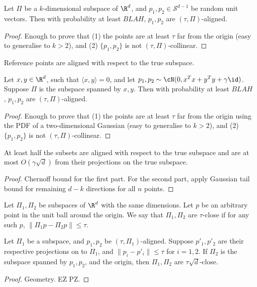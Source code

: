 \begin{lemma}
    Let $\Pi$ be a $k$-dimensional subspace of $\R^d$,
    and $p_1,p_2\in\mathcal{S}^{d-1}$ be random unit vectors.
    Then with probability at least $BLAH$, $p_1,p_2$ are
    $(\tau,\Pi)$-aligned.
\end{lemma}
\begin{proof}
    Enough to prove that (1) the points are
    at least $\tau$ far from the origin (easy to generalise
    to $k>2$), and (2) $\{p_1,p_2\}$ is not $(\tau,\Pi)$-collinear.
\end{proof}

\begin{corollary}
    Reference points are aligned with respect to the true
    subspace.
\end{corollary}

\begin{lemma}
    Let $x,y \in \R^d$, such that $\langle x,y \rangle = 0$,
    and let $p_1,p_2 \sim \cN(0,x^Tx + y^Ty + \gamma \id)$.
    Suppose $\Pi$ is the subspace spanned by $x,y$. Then with
    probability at least $BLAH$, $p_1,p_2$ are $(\tau,\Pi)$-aligned.
\end{lemma}
\begin{proof}
    Enough to prove that (1) the points are
    at least $\tau$ far from the origin using the PDF of
    a two-dimensional Gaussian (easy to generalise
    to $k>2$), and (2) $\{p_1,p_2\}$ is not $(\tau,\Pi)$-collinear.
\end{proof}

\begin{corollary}
    At least half the subsets are aligned with respect to
    the true subspace and are at most $O(\gamma\sqrt{d})$
    from their projections on the true subspace.
\end{corollary}
\begin{proof}
    Chernoff bound for the first part. For the second part,
    apply Gaussian tail bound for remaining $d-k$ directions
    for all $n$ points.
\end{proof}

\begin{definition}
    Let $\Pi_1,\Pi_2$ be subspaces of $\R^d$ with the same
    dimensions. Let $p$ be an arbitrary point in the unit
    ball around the origin. We say that $\Pi_1,\Pi_2$ are
    $\tau$-close if for any such $p$,
    $\|\Pi_1 p - \Pi_2 p\| \leq \tau$.
\end{definition}

\begin{lemma}
    Let $\Pi_1$ be a subspace, and $p_1,p_2$ be
    $(\tau,\Pi_1)$-aligned. Suppose $p'_1,p'_2$ are their
    respective projections on to $\Pi_1$, and
    $\|p_i-p'_i\| \leq \tau$ for $i = 1,2$. If $\Pi_2$
    is the subspace spanned by $p_1,p_2$, and the origin,
    then $\Pi_1,\Pi_2$ are $\tau\sqrt{d}$-close.
\end{lemma}
\begin{proof}
    Geometry. EZ PZ.
\end{proof}

